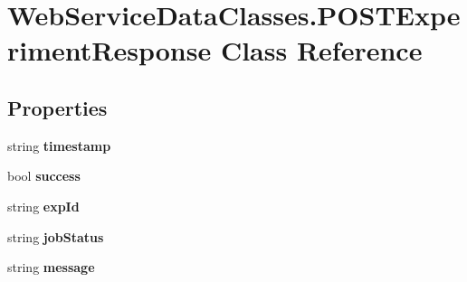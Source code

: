 \hypertarget{class_web_service_data_classes_1_1_p_o_s_t_experiment_response}{}\section{Web\+Service\+Data\+Classes.\+P\+O\+S\+T\+Experiment\+Response Class Reference}
\label{class_web_service_data_classes_1_1_p_o_s_t_experiment_response}
\subsection*{Properties}
\begin{DoxyCompactItemize}
\item 
\hypertarget{class_web_service_data_classes_1_1_p_o_s_t_experiment_response_ab47a09fab15a3a25c78f4093bc5ebe35}{}string {\bfseries timestamp}\label{class_web_service_data_classes_1_1_p_o_s_t_experiment_response_ab47a09fab15a3a25c78f4093bc5ebe35}

\item 
\hypertarget{class_web_service_data_classes_1_1_p_o_s_t_experiment_response_a83449ded346417c11b0764b5d84d68cd}{}bool {\bfseries success}\label{class_web_service_data_classes_1_1_p_o_s_t_experiment_response_a83449ded346417c11b0764b5d84d68cd}

\item 
\hypertarget{class_web_service_data_classes_1_1_p_o_s_t_experiment_response_a2bf3eab8be0b071159237b142a8aae93}{}string {\bfseries exp\+Id}\label{class_web_service_data_classes_1_1_p_o_s_t_experiment_response_a2bf3eab8be0b071159237b142a8aae93}

\item 
\hypertarget{class_web_service_data_classes_1_1_p_o_s_t_experiment_response_a5587fc23aa3df6d22cb18fa59c8c10ec}{}string {\bfseries job\+Status}\label{class_web_service_data_classes_1_1_p_o_s_t_experiment_response_a5587fc23aa3df6d22cb18fa59c8c10ec}

\item 
\hypertarget{class_web_service_data_classes_1_1_p_o_s_t_experiment_response_aca8b7de8531db7d6c31c2dd22e3c8ae1}{}string {\bfseries message}\label{class_web_service_data_classes_1_1_p_o_s_t_experiment_response_aca8b7de8531db7d6c31c2dd22e3c8ae1}

\end{DoxyCompactItemize}


